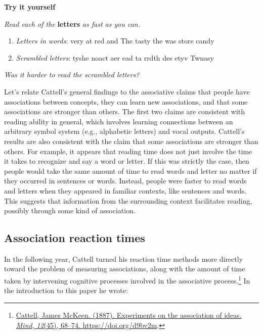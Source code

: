 \documentclass[
  oneside,
  12pt]{crumpbook}
\newenvironment{floatrightbox50}{%
  \wrapfigure{R}{.5\textwidth}%
  }{%
  \endwrapfigure}
\begin{document}
\begin{floatrightbox50}
\textbf{Try it yourself}

\emph{Read each of the} \textbf{letters} \emph{as fast as you can.}

\begin{enumerate}
\def\labelenumi{\arabic{enumi}.}
\item
  \emph{Letters in words}: very at red and The tasty the was store candy
\item
  \emph{Scrambled letters}: tyshe noact aer ead ta rrdth des etyv Twnasy
\end{enumerate}

\emph{Was it harder to read the scrambled letters?}

\end{floatrightbox50}

Let's relate Cattell's general findings to the associative claims that people have associations between concepts, they can learn new associations, and that some associations are stronger than others. The first two claims are consistent with reading ability in general, which involves learning connections between an arbitrary symbol system (e.g., alphabetic letters) and vocal outputs. Cattell's results are also consistent with the claim that some associations are stronger than others. For example, it appears that reading time does not just involve the time it takes to recognize and say a word or letter. If this was strictly the case, then people would take the same amount of time to read words and letter no matter if they occurred in sentences or words. Instead, people were faster to read words and letters when they appeared in familiar contexts, like sentences and words. This suggests that information from the surrounding context facilitates reading, possibly through some kind of association.

\hypertarget{association-reaction-times}{%
\subsection{Association reaction times}\label{association-reaction-times}}

In the following year, Cattell turned his reaction time methods more directly toward the problem of measuring associations, along with the amount of time taken by intervening cognitive processes involved in the associative process.\footnote{\protect\hyperlink{ref-cattellExperimentsAssociationIdeas1887}{Cattell, James McKeen. (1887). Experiments on the association of ideas. \emph{Mind}, \emph{12}(45), 68--74. \url{https://doi.org/d9bv2m}}.} In the introduction to this paper he wrote:
\end{document}
